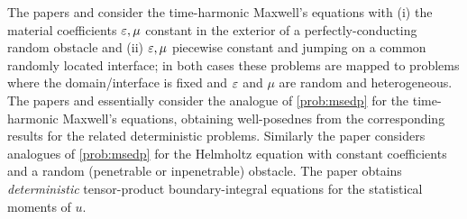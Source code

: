 The papers \cite{JeScZe:17} and \cite{JeSc:16} consider the time-harmonic Maxwell's equations with (i) the material coefficients $\varepsilon,\mu$ constant in the exterior of a perfectly-conducting random obstacle and (ii) $\varepsilon,\mu$ piecewise constant and jumping on a common randomly located interface; in both cases these problems are mapped to problems where the domain/interface is fixed and $\varepsilon$ and $\mu$ are random and heterogeneous. The papers \cite{JeScZe:17} and \cite{JeSc:16} essentially consider the analogue of \cref{prob:msedp} for the time-harmonic Maxwell's equations, obtaining well-posednes from the corresponding results for the related deterministic problems. Similarly the paper \cite{EsJe:19} considers analogues of \cref{prob:msedp} for the Helmholtz equation with constant coefficients and a random (penetrable or inpenetrable) obstacle. The paper \cite{EsJe:19} obtains \emph{deterministic} tensor-product boundary-integral equations for the statistical moments of $u.$
